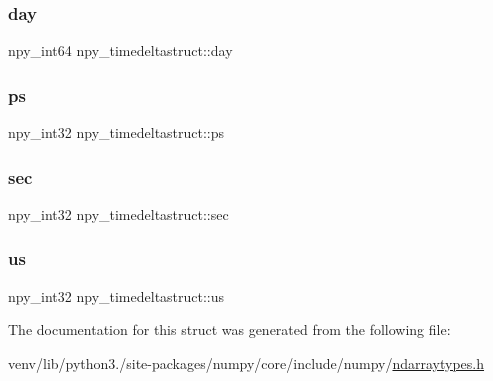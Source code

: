 \subsubsection{\texorpdfstring{day}{day}}
{\footnotesize\ttfamily npy\+\_\+int64 npy\+\_\+timedeltastruct\+::day}

\mbox{\label{structnpy__timedeltastruct_a34ce3cfa60800b41e16251ce55ef655d}} 
\subsubsection{\texorpdfstring{ps}{ps}}
{\footnotesize\ttfamily npy\+\_\+int32 npy\+\_\+timedeltastruct\+::ps}

\mbox{\label{structnpy__timedeltastruct_a6242f413150d736dccc16155808a32fa}} 
\subsubsection{\texorpdfstring{sec}{sec}}
{\footnotesize\ttfamily npy\+\_\+int32 npy\+\_\+timedeltastruct\+::sec}

\mbox{\label{structnpy__timedeltastruct_a46be561563734de4d4c9ab188206d8bd}} 
\subsubsection{\texorpdfstring{us}{us}}
{\footnotesize\ttfamily npy\+\_\+int32 npy\+\_\+timedeltastruct\+::us}



The documentation for this struct was generated from the following file\+:\begin{DoxyCompactItemize}
\item 
venv/lib/python3./site-\/packages/numpy/core/include/numpy/\hyperlink{ndarraytypes_8h}{ndarraytypes.\+h}\end{DoxyCompactItemize}

